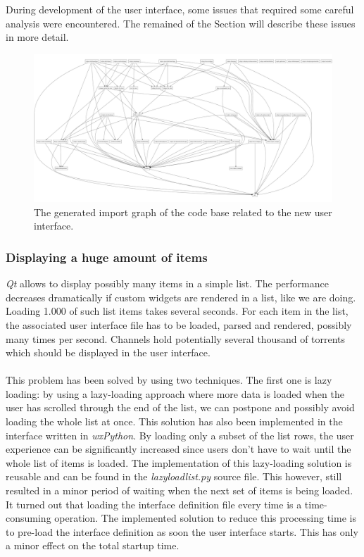 During development of the user interface, some issues that required some careful analysis were encountered. The remained of the Section will describe these issues in more detail.

\begin{figure}[h!]
	\centering
	\includegraphics[width=1.0\columnwidth]{images/improving_qa/importgraph_new_gui}
	\caption{The generated import graph of the code base related to the new user interface.}
	\label{fig:importgraph-qt-gui}
\end{figure}

\subsubsection{\textbf{Displaying a huge amount of items}}
\emph{Qt} allows to display possibly many items in a simple list. The performance decreases dramatically if custom widgets are rendered in a list, like we are doing. Loading 1.000 of such list items takes several seconds. For each item in the list, the associated user interface file has to be loaded, parsed and rendered, possibly many times per second. Channels hold potentially several thousand of torrents which should be displayed in the user interface.\\\\
This problem has been solved by using two techniques. The first one is lazy loading: by using a lazy-loading approach where more data is loaded when the user has scrolled through the end of the list, we can postpone and possibly avoid loading the whole list at once. This solution has also been implemented in the interface written in \emph{wxPython}. By loading only a subset of the list rows, the user experience can be significantly increased since users don't have to wait until the whole list of items is loaded. The implementation of this lazy-loading solution is reusable and can be found in the \emph{lazyloadlist.py} source file. This however, still resulted in a minor period of waiting when the next set of items is being loaded. It turned out that loading the interface definition file every time is a time-consuming operation. The implemented solution to reduce this processing time is to pre-load the interface definition as soon the user interface starts. This has only a minor effect on the total startup time.

